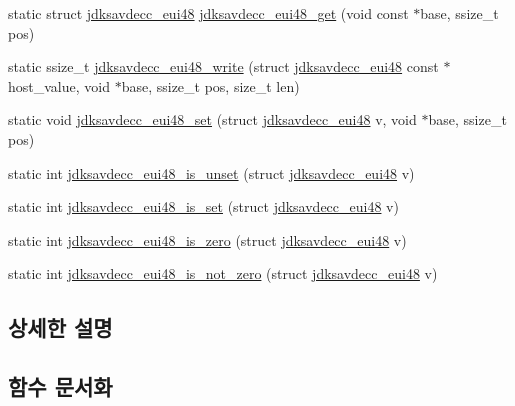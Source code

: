 \begin{DoxyCompactItemize}
static struct \hyperlink{structjdksavdecc__eui48}{jdksavdecc\+\_\+eui48} \hyperlink{group__eui48_ga7b4c95f03a90bdf416e9d0833ac08a86}{jdksavdecc\+\_\+eui48\+\_\+get} (void const $\ast$base, ssize\+\_\+t pos)
\item 
static ssize\+\_\+t \hyperlink{group__eui48_gaad209ab4f0bbbd905ad7a71cdfb4a992}{jdksavdecc\+\_\+eui48\+\_\+write} (struct \hyperlink{structjdksavdecc__eui48}{jdksavdecc\+\_\+eui48} const $\ast$host\+\_\+value, void $\ast$base, ssize\+\_\+t pos, size\+\_\+t len)
\item 
static void \hyperlink{group__eui48_ga469d246a17ff1ee085030ee7dae57c5e}{jdksavdecc\+\_\+eui48\+\_\+set} (struct \hyperlink{structjdksavdecc__eui48}{jdksavdecc\+\_\+eui48} v, void $\ast$base, ssize\+\_\+t pos)
\item 
static int \hyperlink{group__eui48_ga3d2024d211896441c68936a30ff26422}{jdksavdecc\+\_\+eui48\+\_\+is\+\_\+unset} (struct \hyperlink{structjdksavdecc__eui48}{jdksavdecc\+\_\+eui48} v)
\item 
static int \hyperlink{group__eui48_ga6b58b534a7d0377c50fd3e04f6fdf767}{jdksavdecc\+\_\+eui48\+\_\+is\+\_\+set} (struct \hyperlink{structjdksavdecc__eui48}{jdksavdecc\+\_\+eui48} v)
\item 
static int \hyperlink{group__eui48_ga9a4917be6523d87838514859e20a5747}{jdksavdecc\+\_\+eui48\+\_\+is\+\_\+zero} (struct \hyperlink{structjdksavdecc__eui48}{jdksavdecc\+\_\+eui48} v)
\item 
static int \hyperlink{group__eui48_gadbc412b097f3a8e2b9349105a3441ef7}{jdksavdecc\+\_\+eui48\+\_\+is\+\_\+not\+\_\+zero} (struct \hyperlink{structjdksavdecc__eui48}{jdksavdecc\+\_\+eui48} v)
\end{DoxyCompactItemize}


\subsection{상세한 설명}


\subsection{함수 문서화}
